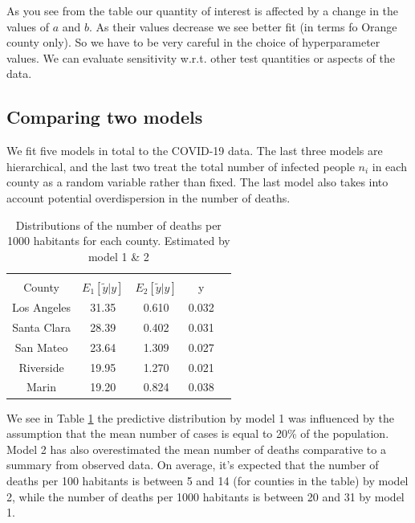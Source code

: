 \documentclass[11pt,twocolumn]{asaproc}
\begin{document}
As you see from the table our quantity of interest is affected by a change in the values of $a$ and $b$. As their values decrease we see better fit (in terms fo Orange county only). So we have to be very careful in the choice of hyperparameter values. We can evaluate sensitivity w.r.t. other test quantities or aspects of the data.








\subsection{Comparing two models}
We fit five models in total to the COVID-19 data. The last three models are hierarchical, and the last two treat the total number of infected people $n_i$ in each county as a random variable rather than fixed. The last model also takes into account potential overdispersion in the number of deaths. 

\begin{table}
\caption{Distributions of the number of deaths per 1000 habitants for each county. Estimated by model 1 \& 2}
\label{tab:deaths}
\begin{center}
\begin{tabular}{ccccc}
\hline
\hline
\\[-5pt]
\multicolumn{1}{c}{County} &
\multicolumn{1}{c}{$E_{1}[\tilde{y}|y]$} &
\multicolumn{1}{c}{$E_{2}[\tilde{y}|y]$} &
\multicolumn{1}{c}{y}\\
\hline
Los Angeles&	31.35&   0.610 & 0.032\\
Santa Clara&     28.39&  0.402 &	 0.031\\
San Mateo&	23.64& 1.309	& 0.027\\
Riverside&     19.95&  1.270 & 0.021\\
Marin&     19.20& 0.824 & 0.038\\
\hline
\end{tabular}
\end{center}
\end{table}

We see in Table \ref{tab:deaths} the predictive distribution by model 1 was influenced by the assumption that the mean number of cases is equal to 20\% of the population. Model 2 has also overestimated the mean number of deaths comparative to a summary from observed data. On average, it's expected that the number of deaths per 100 habitants is between 5 and 14 (for counties in the table) by model 2, while the number of deaths per 1000 habitants is between 20 and 31 by model 1.
\end{document}
